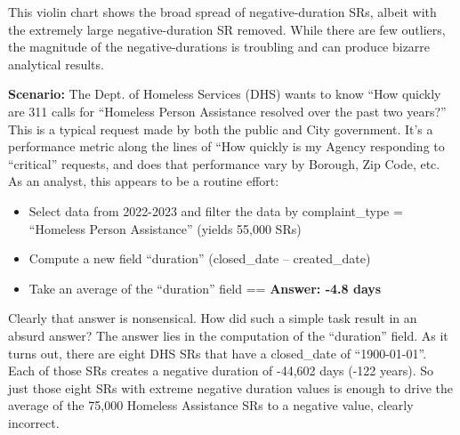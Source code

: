 \documentclass[12pt, titlepage]{article}
\begin{document}
	
This violin chart shows the broad spread of negative-duration SRs, albeit with 
the extremely large negative-duration SR removed. While there are few 
outliers, the magnitude of the negative-durations is troubling and can 
produce bizarre analytical results.




\label{sec:homlessassistance}
\textbf{Scenario:} The Dept. of Homeless Services (DHS) wants to 
know ``How quickly are 311 calls for ``Homeless Person Assistance
resolved over the past two years?'' This is a typical request made by 
both the public and City government. It's a performance metric along 
the lines of ``How quickly is my Agency responding to ``critical'' 
requests, and does that performance vary by Borough, Zip Code, etc. 
As an analyst, this appears to be a routine effort: 

		
\begin{itemize}
    \item Select data from 2022-2023 and filter the data by 
    complaint\_type = ``Homeless Person Assistance'' (yields 55,000 SRs)
    \item Compute a new field ``duration'' (closed\_date – created\_date)
    \item Take an average of the ``duration'' field == \textbf{Answer:  -4.8 days}  
\end{itemize}

		
Clearly that answer is nonsensical. How did such a simple task result 
in an absurd answer? The answer lies in the computation of the ``duration'' 
field. As it turns out, there are eight DHS SRs that have a closed\_date 
of ``1900-01-01''. Each of those SRs creates a negative duration of -44,602 
days (-122 years). So just those eight SRs with extreme negative duration 
values is enough to drive the average of the 75,000 
Homeless Assistance SRs to a negative value, clearly incorrect.
		
\end{document}
